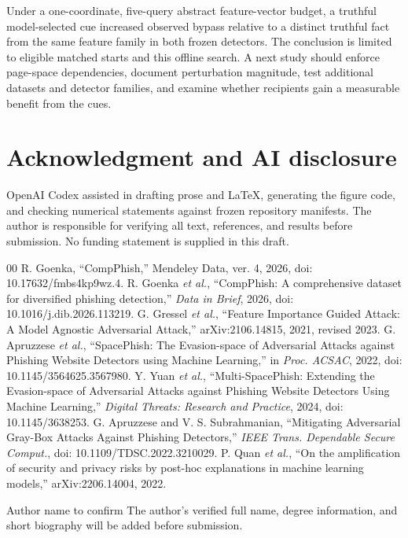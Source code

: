 \documentclass{ieeeaccess}
\begin{document}
Under a one-coordinate, five-query abstract feature-vector budget, a truthful model-selected cue increased observed bypass relative to a distinct truthful fact from the same feature family in both frozen detectors. The conclusion is limited to eligible matched starts and this offline search. A next study should enforce page-space dependencies, document perturbation magnitude, test additional datasets and detector families, and examine whether recipients gain a measurable benefit from the cues.

\section*{Acknowledgment and AI disclosure}
OpenAI Codex assisted in drafting prose and LaTeX, generating the figure code, and checking numerical statements against frozen repository manifests. The author is responsible for verifying all text, references, and results before submission. No funding statement is supplied in this draft.

\begin{thebibliography}{00}
 R. Goenka, ``CompPhish,'' Mendeley Data, ver. 4, 2026, doi: 10.17632/fmbs4kp9wz.4.
 R. Goenka \emph{et al.}, ``CompPhish: A comprehensive dataset for diversified phishing detection,'' \emph{Data in Brief}, 2026, doi: 10.1016/j.dib.2026.113219.
 G. Gressel \emph{et al.}, ``Feature Importance Guided Attack: A Model Agnostic Adversarial Attack,'' arXiv:2106.14815, 2021, revised 2023.
 G. Apruzzese \emph{et al.}, ``SpacePhish: The Evasion-space of Adversarial Attacks against Phishing Website Detectors using Machine Learning,'' in \emph{Proc. ACSAC}, 2022, doi: 10.1145/3564625.3567980.
 Y. Yuan \emph{et al.}, ``Multi-SpacePhish: Extending the Evasion-space of Adversarial Attacks against Phishing Website Detectors Using Machine Learning,'' \emph{Digital Threats: Research and Practice}, 2024, doi: 10.1145/3638253.
 G. Apruzzese and V. S. Subrahmanian, ``Mitigating Adversarial Gray-Box Attacks Against Phishing Detectors,'' \emph{IEEE Trans. Dependable Secure Comput.}, doi: 10.1109/TDSC.2022.3210029.
 P. Quan \emph{et al.}, ``On the amplification of security and privacy risks by post-hoc explanations in machine learning models,'' arXiv:2206.14004, 2022.
\end{thebibliography}

\begin{IEEEbiographynophoto}{Author name to confirm}
The author's verified full name, degree information, and short biography will be added before submission.
\end{IEEEbiographynophoto}
\EOD
\end{document}

